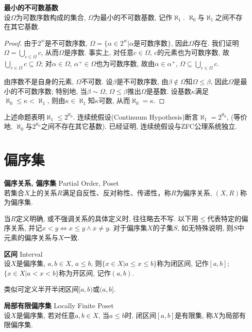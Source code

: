 \begin{pro}\textbf{最小的不可数基数}\\
设$\Omega$为可数序数构成的集合, $\Omega$为最小的不可数基数, 记作$\aleph_1$. $\aleph_0$与$\aleph_1$之间不存在其它基数. 
\end{pro}
\begin{proof}
由于$2^w$是不可数序数, $\Omega=\{\alpha\in 2^w\vert \alpha\text{是可数序数}\}$, 因此$\Omega$存在. 我们证明$\Omega=\bigcup_{c\in \Omega} c$, 从而$\Omega$是序数. 事实上, 对任意$c\in \Omega$, $c$的元素也为可数序数, 故$\bigcup_{c\in \Omega} c \subseteq \Omega$; 对$\alpha\in \Omega$, $\alpha^+\in \Omega$也为可数序数, 故由$\alpha\in \alpha^+$, $\Omega \subseteq \bigcup_{c\in \Omega} c$. 
\par 由序数不是自身的元素, $\Omega$不可数. 设$\beta$是不可数序数, 由$\beta \notin \Omega$知$\Omega \le \beta$, 因此$\Omega$是最小的不可数序数; 特别地, 当$\beta\sim \Omega$, $\Omega \le \beta$推出$\Omega$是基数. 设基数$\kappa$满足$\aleph_0\le \kappa <\aleph_1$, 则由$\kappa \in \aleph_1$知$\kappa$可数, 从而$\aleph_0=\kappa$. 
\end{proof}
上述命题表明$\aleph_1\le 2^{\aleph_0}$. 连续统假设(Continuum Hypothesis)断言$\aleph_1= 2^{\aleph_0}$, (等价地, $\aleph_0$与$2^{\aleph_0}$之间不存在其它基数). 已经证明, 连续统假设与ZFC公理系统独立. 

\section{偏序集}

\begin{dfn} \textbf{偏序关系, 偏序集} Partial Order, Poset\\
若集合$X$上的关系$R$满足自反性、反对称性、传递性，称$R$为偏序关系, $(X,R)$称为偏序集. 
\end{dfn}
\par 当$R$定义明确, 或不强调关系的具体定义时, 往往略去不写. 以下用$\le$代表特定的偏序关系, 并记$x<y\iff x\le y\land x\neq y$. 对于偏序集$X$的子集$S$, 如无特殊说明, 则$S$中元素的偏序关系与$X$一致. 

\begin{dfn} \textbf{区间} Interval\\
设$X$是偏序集, $a,b\in X$, $a\le b$, 则$\{x\in X\vert a\le x\le b\}$称为闭区间, 记作$[a,b]$;  $\{x\in X\vert a<x<b\}$称为开区间, 记作$(a,b)$. 
\end{dfn}
类似可定义半开半闭区间$[a,b)$或$(a,b]$. 

\begin{dfn} \textbf{局部有限偏序集} Locally Finite Poset\\
设$X$是偏序集, 若对任意$a,b\in X$, 当$a\le b$时, 闭区间$[a,b]$是有限集, 称$X$为局部有限偏序集. 
\end{dfn}

